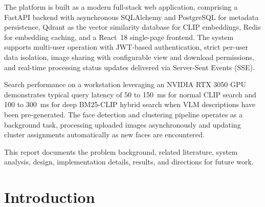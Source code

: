 \documentclass[12pt,a4paper,oneside]{report}
\newif\iffrontmatterlist\frontmatterlistfalse
\begin{document}
The platform is built as a modern full-stack web application, comprising a
FastAPI backend with asynchronous SQLAlchemy and PostgreSQL for metadata
persistence, Qdrant as the vector similarity database for CLIP embeddings,
Redis for embedding caching, and a React~18 single-page frontend.  The system
supports multi-user operation with JWT-based authentication, strict per-user
data isolation, image sharing with configurable view and download permissions,
and real-time processing status updates delivered via Server-Sent Events
(SSE).

Search performance on a workstation leveraging an NVIDIA RTX 3050 GPU demonstrates typical
query latency of 50 to 150~ms for normal CLIP search and 100 to 300~ms for
deep BM25-CLIP hybrid search when VLM descriptions have been pre-generated.
The face detection and clustering pipeline operates as a background task,
processing uploaded images asynchronously and updating cluster assignments
automatically as new faces are encountered.

This report documents the problem background, related literature, system
analysis, design, implementation details, results, and directions for future
work.

\renewcommand{\contentsname}{Table of Contents}
\clearpage
\frontmatterlisttrue
\pagestyle{romanplain}
\tableofcontents

\clearpage
\pagestyle{romanplain}
\listoffigures
{}

\clearpage
\pagestyle{romanplain}
\listoftables
{}

\clearpage
\frontmatterlistfalse

\clearpage
{}
\pagestyle{hbfancy}

\chapter{Introduction}
\end{document}
